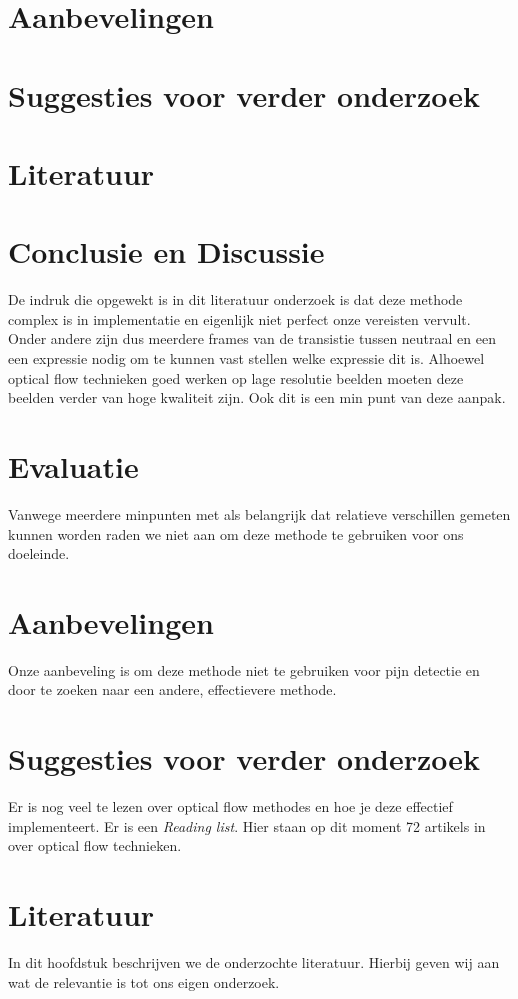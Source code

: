 \documentclass[11pt]{article}
\begin{document}
    \section{Aanbevelingen}\label{sec:aanbevelingen}


    \section{Suggesties voor verder onderzoek}\label{sec:suggesties-voor-verder-onderzoek}


    \section{Literatuur}\label{sec:literatuur}


    
    \section{Conclusie en Discussie}\label{sec:conclusie-en-discussie}
    De indruk die opgewekt is in dit literatuur onderzoek is dat deze methode complex is in implementatie en eigenlijk niet perfect onze vereisten vervult.
    Onder andere zijn dus meerdere frames van de transistie tussen neutraal en een een expressie nodig om te kunnen vast stellen welke expressie dit is.
    Alhoewel optical flow technieken goed werken op lage resolutie beelden moeten deze beelden verder van hoge kwaliteit zijn.
    Ook dit is een min punt van deze aanpak.


    \section{Evaluatie}\label{sec:evaluatie2}
    Vanwege meerdere minpunten met als belangrijk dat relatieve verschillen gemeten kunnen worden raden we niet aan om deze methode te gebruiken voor ons doeleinde.


    \section{Aanbevelingen}\label{sec:aanbevelingen2}
    Onze aanbeveling is om deze methode niet te gebruiken voor pijn detectie en door te zoeken naar een andere, effectievere methode.


    \section{Suggesties voor verder onderzoek}\label{sec:suggesties-voor-verder-onderzoek2}
    Er is nog veel te lezen over optical flow methodes en hoe je deze effectief implementeert.
    Er is een \emph{\citet{Readinglist} Reading list}.
    Hier staan op dit moment 72 artikels in over optical flow technieken.


    \section{Literatuur}\label{sec:literatuur2}
    In dit hoofdstuk beschrijven we de onderzochte literatuur.
    Hierbij geven wij aan wat de relevantie is tot ons eigen onderzoek.



    

    
\end{document}
